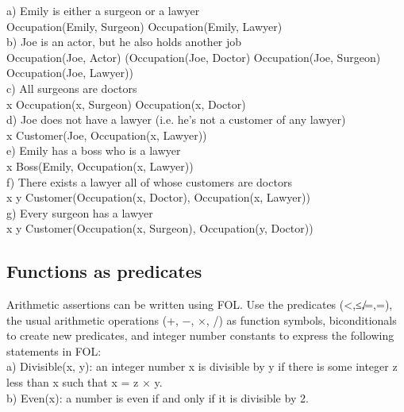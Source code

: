 \documentclass{article}
\begin{document}
a) Emily is either a surgeon or a lawyer\\
Occupation(Emily, \neg Surgeon) \wedge Occupation(Emily, \neg Lawyer)\\

b) Joe is an actor, but he also holds another job\\
Occupation(Joe, Actor) \wedge (Occupation(Joe, Doctor) \vee Occupation(Joe, Surgeon) \vee Occupation(Joe, Lawyer))\\

c) All surgeons are doctors\\
\forall x \: Occupation(x, Surgeon) \Rightarrow Occupation(x, Doctor)\\

d) Joe does not have a lawyer (i.e. he’s not a customer of any lawyer)\\
\exists x \: Customer(Joe, \neg Occupation(x, Lawyer))\\

e) Emily has a boss who is a lawyer\\
\exists x \: Boss(Emily, Occupation(x, Lawyer))\\

f) There exists a lawyer all of whose customers are doctors\\
\exists x \forall y \: Customer(Occupation(x, Doctor), Occupation(x, Lawyer))\\

g) Every surgeon has a lawyer\\
\forall x \exists y \: Customer(Occupation(x, Surgeon), Occupation(y, Doctor))\\


\subsection{Functions as predicates}

Arithmetic assertions can be written using FOL. Use the predicates (<,≤,̸=,=), the usual arithmetic operations (+, −, ×, /) as function symbols, biconditionals to create new predicates, and integer number constants to express the following statements in FOL:\\

a) Divisible(x, y): an integer number x is divisible by y if there is some integer z less than x such that x = z × y.\\

b) Even(x): a number is even if and only if it is divisible by 2.\\
\end{document}
